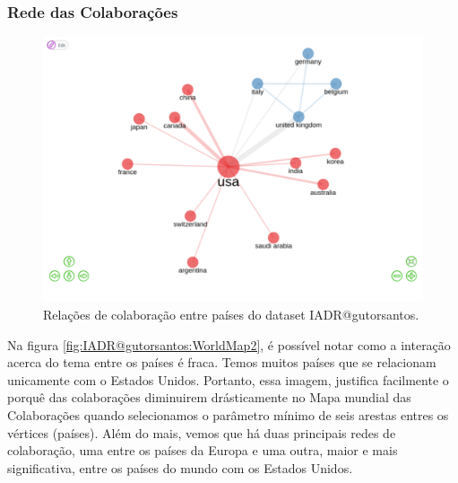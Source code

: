 \subsubsection{Rede das Colaborações}

\begin{figure}[H]
    \centering
\includegraphics[angle=0,width=1\textwidth]{experiments/gutorsantos/AnaliseBibliometrica/IAeDiscriminacao/imgs/CollaborationCountries.png}
    \caption{Relações de colaboração entre países do dataset IADR@gutorsantos.}
    \label{fig:IADR@gutorsantos:CollabCountries}
\end{figure}

Na figura \ref{fig:IADR@gutorsantos:WorldMap2}, é possível notar como a interação acerca do tema entre os países é fraca. Temos muitos países que se relacionam unicamente com o Estados Unidos. Portanto, essa imagem, justifica facilmente o porquê das colaborações diminuirem drásticamente no Mapa mundial das Colaborações quando selecionamos o parâmetro mínimo de seis arestas entres os vértices (países). Além do mais, vemos que há duas principais redes de colaboração, uma entre os países da Europa e uma outra, maior e mais significativa, entre os países do mundo com os Estados Unidos. 

